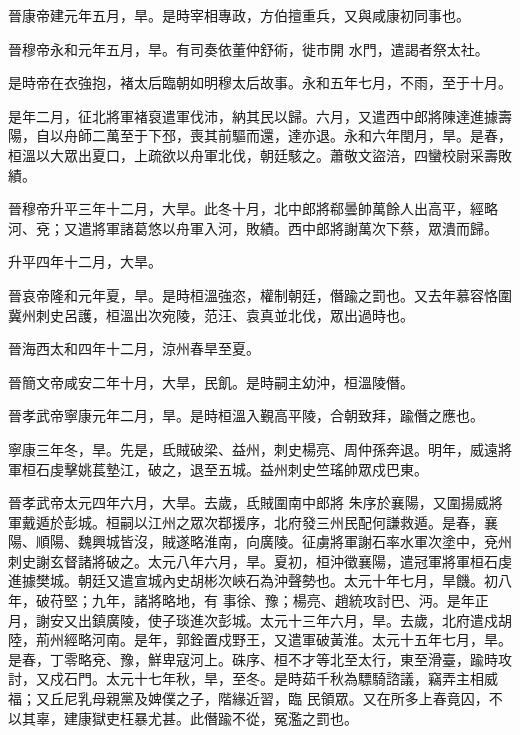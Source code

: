 \begin{pinyinscope}
 晉康帝建元年五月，旱。是時宰相專政，方伯擅重兵，又與咸康初同事也。



 晉穆帝永和元年五月，旱。有司奏依董仲舒術，徙市開
 水門，遣謁者祭太社。



 是時帝在衣強抱，褚太后臨朝如明穆太后故事。永和五年七月，不雨，至于十月。



 是年二月，征北將軍褚裒遣軍伐沛，納其民以歸。六月，又遣西中郎將陳達進據壽陽，自以舟師二萬至于下邳，喪其前驅而還，達亦退。永和六年閏月，旱。是春，桓溫以大眾出夏口，上疏欲以舟軍北伐，朝廷駭之。蕭敬文盜涪，四蠻校尉采壽敗績。



 晉穆帝升平三年十二月，大旱。此冬十月，北中郎將郗曇帥萬餘人出高平，經略河、兗；又遣將軍諸葛悠以舟軍入河，敗績。西中郎將謝萬次下蔡，眾潰而歸。



 升平四年十二月，大旱。



 晉哀帝隆和元年夏，旱。是時桓溫強恣，權制朝廷，僭踰之罰也。又去年慕容恪圍冀州刺史呂護，桓溫出次宛陵，范汪、袁真並北伐，眾出過時也。



 晉海西太和四年十二月，涼州春旱至夏。



 晉簡文帝咸安二年十月，大旱，民飢。是時嗣主幼沖，桓溫陵僭。



 晉孝武帝寧康元年二月，旱。是時桓溫入覲高平陵，合朝致拜，踰僭之應也。



 寧康三年冬，旱。先是，氐賊破梁、益州，刺史楊亮、周仲孫奔退。明年，威遠將軍桓石虔擊姚萇墊江，破之，退至五城。益州刺史竺瑤帥眾戍巴東。



 晉孝武帝太元四年六月，大旱。去歲，氐賊圍南中郎將
 朱序於襄陽，又圍揚威將軍戴遁於彭城。桓嗣以江州之眾次鄀援序，北府發三州民配何謙救遁。是春，襄陽、順陽、魏興城皆沒，賊遂略淮南，向廣陵。征虜將軍謝石率水軍次塗中，兗州刺史謝玄督諸將破之。太元八年六月，旱。夏初，桓沖徵襄陽，遣冠軍將軍桓石虔進據樊城。朝廷又遣宣城內史胡彬次峽石為沖聲勢也。太元十年七月，旱饑。初八年，破苻堅；九年，諸將略地，有
 事徐、豫；楊亮、趙統攻討巴、沔。是年正月，謝安又出鎮廣陵，使子琰進次彭城。太元十三年六月，旱。去歲，北府遣戍胡陸，荊州經略河南。是年，郭銓置戍野王，又遣軍破黃淮。太元十五年七月，旱。是春，丁零略兗、豫，鮮卑寇河上。硃序、桓不才等北至太行，東至滑臺，踰時攻討，又戍石門。太元十七年秋，旱，至冬。是時茹千秋為驃騎諮議，竊弄主相威福；又丘尼乳母親黨及婢僕之子，階緣近習，臨
 民領眾。又在所多上春竟囚，不以其辜，建康獄吏枉暴尤甚。此僭踰不從，冤濫之罰也。




\end{pinyinscope}
